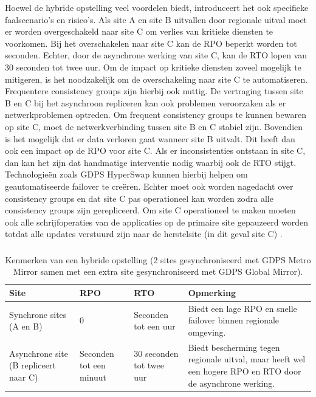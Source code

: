 Hoewel de hybride opstelling veel voordelen biedt, introduceert het ook specifieke faalscenario's en risico's.
Als site A en site B uitvallen door regionale uitval moet er worden overgeschakeld naar site C om verlies van kritieke diensten te voorkomen.
Bij het overschakelen naar site C kan de RPO beperkt worden tot seconden.
Echter, door de asynchrone werking van site C, kan de RTO lopen van 30 seconden tot twee uur.
Om de impact op kritieke diensten zoveel mogelijk te mitigeren, is het noodzakelijk om de overschakeling naar site C te automatiseren.
Frequentere consistency groups zijn hierbij ook nuttig.
De vertraging tussen site B en C bij het asynchroon repliceren kan ook problemen veroorzaken als er netwerkproblemen optreden.
Om frequent consistency groups te kunnen bewaren op site C, moet de netwerkverbinding tussen site B en C stabiel zijn.
Bovendien is het mogelijk dat er data verloren gaat wanneer site B uitvalt.
Dit heeft dan ook een impact op de RPO voor site C.
Als er inconsistenties ontstaan in site C, dan kan het zijn dat handmatige interventie nodig waarbij ook de RTO stijgt.
Technologieën zoals GDPS HyperSwap kunnen hierbij helpen om geautomatiseerde failover te creëren.
Echter moet ook worden nagedacht over consistency groups en dat site C pas operationeel kan worden zodra alle consistency groups zijn gerepliceerd.
Om site C operationeel te maken moeten ook alle schrijfoperaties van de applicaties op de primaire site gepauzeerd worden totdat alle updates verstuurd zijn naar de herstelsite (in dit geval site C) \autocite{ibm_2021_ibm_copy_consistency_groups}.

\subsubsection{}
\label{sec:hybride-opstelling-impact-rpo-rto}

\begin{table}[H]
\begin{tabularx}{\textwidth}{|p{3cm}|p{2cm}|p{2cm}|X|}
\hline
Site & RPO  & RTO & Opmerking \\ \hline
Synchrone sites (A en B) & 0 & Seconden tot een uur & Biedt een lage RPO en snelle failover binnen regionale omgeving.  \\ \hline
Asynchrone site (B repliceert naar C) & Seconden tot een minuut & 30 seconden tot twee uur & Biedt bescherming tegen regionale uitval, maar heeft wel een hogere RPO en RTO door de asynchrone werking. \\ \hline
\end{tabularx}
\caption{Kenmerken van een hybride opstelling (2 sites gesynchroniseerd met GDPS Metro Mirror samen met een extra site gesynchroniseerd met GDPS Global Mirror).}
\end{table}

